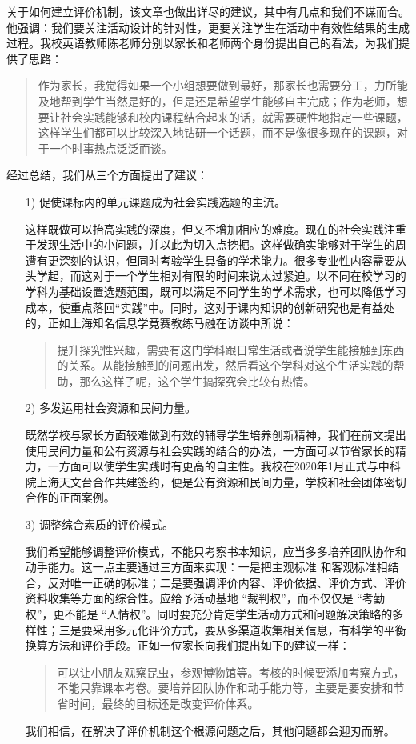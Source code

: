 \documentclass[12pt,UTF8]{ctexart}
\begin{document}
\par {
	
	关于如何建立评价机制，该文章也做出详尽的建议，其中有几点和我们不谋而合。他强调：我们要关注活动设计的针对性，更要关注学生在活动中有效性结果的生成过程。我校英语教师陈老师分别以家长和老师两个身份提出自己的看法，为我们提供了思路：
	\begin{quote}
		\kaishu
		作为家长，我觉得如果一个小组想要做到最好，那家长也需要分工，力所能及地帮到学生当然是好的，但是还是希望学生能够自主完成；作为老师，想要让社会实践能够和校内课程结合起来的话，就需要硬性地指定一些课题，这样学生们都可以比较深入地钻研一个话题，而不是像很多现在的课题，对于一个时事热点泛泛而谈。
	\end{quote}
}
\par {
	经过总结，我们从三个方面提出了建议：
}
\begin{itemize}
	\item [1)] 促使课标内的单元课题成为社会实践选题的主流。
	\par {
		
		这样既做可以抬高实践的深度，但又不增加相应的难度。现在的社会实践注重于发现生活中的小问题，并以此为切入点挖掘。这样做确实能够对于学生的周遭有更深刻的认识，但同时考验学生具备的学术能力。很多专业性内容需要从头学起，而这对于一个学生相对有限的时间来说太过紧迫。以不同在校学习的学科为基础设置选题范围，既可以满足不同学生的学术需求，也可以降低学习成本，使重点落回“实践”中。同时，这对于课内知识的创新研究也是有益处的，正如上海知名信息学竞赛教练马融在访谈中所说：
		\begin{quote}
			\kaishu
			提升探究性兴趣，需要有这门学科跟日常生活或者说学生能接触到东西的关系。从能接触到的问题出发，然后看这个学科对这个生活实践的帮助，那么这样子呢，这个学生搞探究会比较有热情。
		\end{quote}
	}
	\item [2)] 多发运用社会资源和民间力量。
	\par {
		
		既然学校与家长方面较难做到有效的辅导学生培养创新精神，我们在前文提出使用民间力量和公有资源与社会实践的结合的办法，一方面可以节省家长的精力，一方面可以使学生实践时有更高的自主性。我校在2020年1月正式与中科院上海天文台合作共建签约，便是公有资源和民间力量，学校和社会团体密切合作的正面案例。
	}
	\item [3)] 调整综合素质的评价模式。
	\par {
		我们希望能够调整评价模式，不能只考察书本知识，应当多多培养团队协作和动手能力。这一点主要通过三方面来实现：一是把主观标准
		和客观标准相结合，反对唯一正确的标准；二是要强调评价内容、评价依据、评价方式、评价资料收集等方面的综合性。应给予活动基地 “裁判权”，而不仅仅是
		“考勤权”，更不能是
		“人情权”。同时要充分肯定学生活动方式和问题解决策略的多样性；三是要采用多元化评价方式，要从多渠道收集相关信息，有科学的平衡换算方法和评价手段。正如一位家长向我们提出如下的建议一样：
		\begin{quote}
			\kaishu
			可以让小朋友观察昆虫，参观博物馆等。考核的时候要添加考察方式，不能只靠课本考卷。要培养团队协作和动手能力等，主要是要安排和节省时间，最终的目标还是改变评价体系。
		\end{quote}
		我们相信，在解决了评价机制这个根源问题之后，其他问题都会迎刃而解。
	}
\end{itemize}
\end{document}
